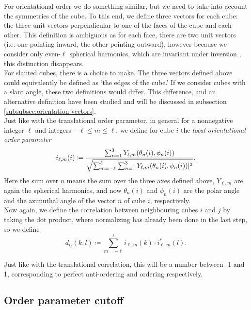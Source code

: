\documentclass[thesis]{subfiles}
\begin{document}
For orientational order we do something similar, but we need to take into account the symmetries of the cube. To this end, we define three vectors for each cube: the three unit vectors perpendicular to one of the faces of the cube and each other. This definition is ambiguous as for each face, there are two unit vectors (i.e. one pointing inward, the other pointing outward), however because we consider only even-$\ell$ spherical harmonics, which are invariant under inversion \cite{steinhardt1983bond}, this distinction disappears.\\
For slanted cubes, there is a choice to make. The three vectors defined above could equivalently be defined as `the edges of the cube.' If we consider cubes with a slant angle, these two definitions would differ. This difference, and an alternative definition have been studied and will be discussed in subsection \ref{subsubsec:orientation vectors}.%
\\
Just like with the translational order parameter, in general for a nonnegative integer $\ell$ and integers $-\ell \leq m \leq \ell$, we define for cube $i$ the \emph{local orientational order parameter}
\begin{equation}
	i_{\ell, m}(i) \coloneqq \frac{\sum_{n = 1}^3 Y_{\ell, m}(\theta_n(i), \phi_n(i))}{\sqrt{\sum_{m = -\ell}^\ell \lvert\sum_{n = 1}^3 Y_{\ell, m}(\theta_n(i), \phi_n(i))\rvert^2}}.
\end{equation}
Here the sum over $n$ means the sum over the three axes defined above, $Y_{\ell, m}$ are again the spherical harmonics, and now $\theta_n(i)$ and $\phi_n(i)$ are the polar angle and the azimuthal angle of the vector $n$ of cube $i$, respectively.\\
Now again, we define the correlation between neighbouring cubes $i$ and $j$ by taking the dot product, where normalizing has already been done in the last step, so we define
\begin{equation}
	d_{i_\ell}(k,l) \coloneqq \sum_{m = -\ell}^\ell i_{\ell, m}(k) \cdot i^*_{\ell, m}(l).
\end{equation}

Just like with the translational correlation, this will be a number between -1 and 1, corresponding to perfect anti-ordering and ordering respectively.

\subsection{Order parameter cutoff} \label{subsec:order param cutoff}
\end{document}
